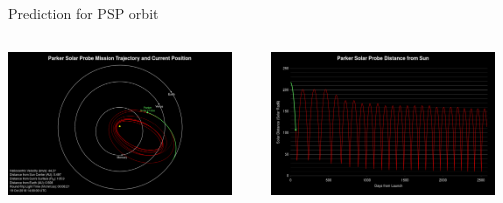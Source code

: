\begin{frame}[plain,c]{Prediction for PSP orbit}{}
	\begin{columns}[t]	%
	
		\hspace*{-22pt}
		\includegraphics[height=0.9\textwidth]{../talk_figures/psp201810_0400_top.png}

	
		\hspace*{-10pt}
		\includegraphics[height=0.9\textwidth]{../talk_figures/psp201810_0400_bottom.png}
		
	\end{columns}
\end{frame}
